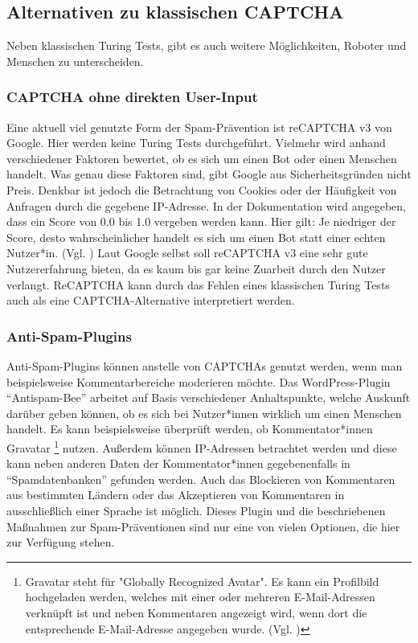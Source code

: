 \subsection{Alternativen zu klassischen CAPTCHA}
Neben klassischen Turing Tests, gibt es auch weitere Möglichkeiten, Roboter und Menschen zu unterscheiden.

\subsubsection*{CAPTCHA ohne direkten User-Input}
Eine aktuell viel genutzte Form der Spam-Prävention ist reCAPTCHA v3 von Google. 
Hier werden keine Turing Tests durchgeführt. 
Vielmehr wird anhand verschiedener Faktoren bewertet, ob es sich um einen Bot oder einen Menschen handelt.
Was genau diese Faktoren sind, gibt Google aus Sicherheitsgründen nicht Preis. 
Denkbar ist jedoch die Betrachtung von Cookies oder der Häufigkeit von Anfragen durch die gegebene IP-Adresse.
In der Dokumentation wird angegeben, dass ein Score von 0.0 bis 1.0 vergeben werden kann. 
Hier gilt: Je niedriger der Score, desto wahrscheinlicher handelt es sich um einen Bot statt einer echten Nutzer*in. (Vgl. \cite{recaptchadoc})
Laut Google selbst soll reCAPTCHA v3 eine sehr gute Nutzererfahrung bieten, da es kaum bis gar keine Zuarbeit durch den Nutzer verlangt. \cite{googleblog:recaptcha}
ReCAPTCHA kann durch das Fehlen eines klassischen Turing Tests auch als eine CAPTCHA-Alternative interpretiert werden.

\subsubsection*{Anti-Spam-Plugins}
Anti-Spam-Plugins können anstelle von CAPTCHAs genutzt werden, wenn man beispielsweise Kommentarbereiche moderieren möchte.
Das WordPress-Plugin ``Antispam-Bee'' arbeitet auf Basis verschiedener Anhaltspunkte, 
welche Auskunft darüber geben können, ob es sich bei Nutzer*innen wirklich um einen Menschen handelt.
Es kann beispielsweise überprüft werden, ob Kommentator*innen Gravatar
\footnote[2]{Gravatar steht für "Globally Recognized Avatar". 
Es kann ein Profilbild hochgeladen werden, welches mit einer oder mehreren E-Mail-Adressen verknüpft ist 
und neben Kommentaren angezeigt wird, wenn dort die entsprechende E-Mail-Adresse angegeben wurde. (Vgl. \cite{doku:antispambee})} nutzen.
Außerdem können IP-Adressen betrachtet werden und diese kann neben anderen Daten der Kommentator*innen gegebenenfalls in ``Spamdatenbanken'' gefunden werden.
Auch das Blockieren von Kommentaren aus bestimmten Ländern oder das Akzeptieren von Kommentaren in ausschließlich einer Sprache ist möglich.
Dieses Plugin und die beschriebenen Maßnahmen zur Spam-Präventionen sind nur eine von vielen Optionen, die hier zur Verfügung stehen.
\cite{blog:antispambee}
\cite{doku:antispambee}
